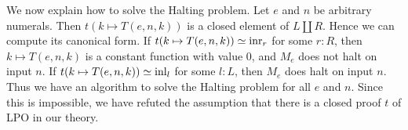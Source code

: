\begin{remark}
We now explain how to solve the Halting problem.
Let $e$ and $n$ be arbitrary numerals. 
Then $t(k\mapsto T(e,n,k))$ is a closed element of $L\coprod R$.
Hence we can compute its canonical form. If $t(k\mapsto T(e,n,k))\jdeq\inr{r}$ for some
$r:R$, then $k\mapsto T(e,n,k)$ is a constant function with value $0$,
and $M_e$ does not halt on input $n$. If $t(k\mapsto T(e,n,k))\jdeq\inl{l}$ for some
$l:L$, then $M_e$ does halt on input $n$.
Thus we have an algorithm to solve the Halting problem
for all $e$ and $n$. Since this is impossible, we have refuted the assumption
that there is a closed proof $t$ of LPO in our theory.
\end{remark}
